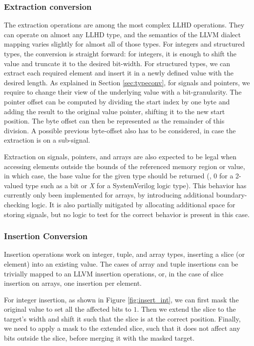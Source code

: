 \subsubsection{Extraction conversion}
\label{sec:extrs}
The extraction operations are among the most complex LLHD operations. They can operate on almost any LLHD type, and the semantics of the LLVM dialect mapping varies slightly for almost all of those types. For integers and structured types, the conversion is straight forward: for integers, it is enough to shift the value and truncate it to the desired bit-width.
For structured types, we can extract each required element and insert it in a newly defined value with the desired length. As explained in Section \ref{sec:typeconv}, for signals and pointers, we require to change their view of the underlying value with a bit-granularity. The pointer offset can be computed by dividing the start index by one byte and adding the result to the original value pointer, shifting it to the new start position. The byte offset can then be represented as the remainder of this division. A possible previous byte-offset also has to be considered, in case the extraction is on a sub-signal.

Extraction on signals, pointers, and arrays are also expected to be legal when accessing elements outside the bounds of the referenced memory region or value, in which case, the base value for the given type should be returned (\ie, $0$ for a 2-valued type such as a bit or \textit{X} for a SystemVerilog logic type). This behavior has currently only been implemented for arrays, by introducing additional boundary-checking logic. It is also partially mitigated by allocating additional space for storing signals, but no logic to test for the correct behavior is present in this case.


\subsubsection{Insertion Conversion}
Insertion operations work on integer, tuple, and array types, inserting a slice (or element) into an existing value. The cases of array and tuple insertions can be trivially mapped to an LLVM insertion operations, or, in the case of slice insertion on arrays, one insertion per element.

For integer insertion, as shown in Figure \ref{fig:insert_int}, we can first mask the original value to set all the affected bits to $1$. Then we extend the slice to the target's width and shift it such that the slice is at the correct position. Finally, we need to apply a mask to the extended slice, such that it does not affect any bits outside the slice, before merging it with the masked target.

